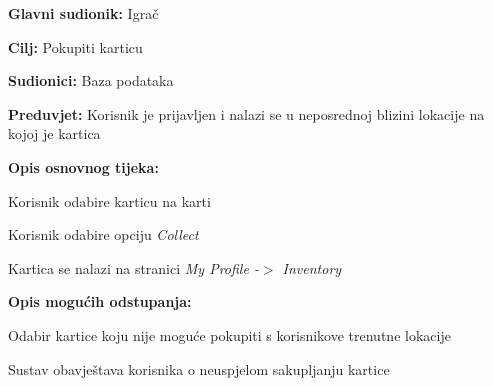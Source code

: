 					\noindent {}
					\begin{packed_item}
	
						\item \textbf{Glavni sudionik: }Igrač
						\item  \textbf{Cilj:} Pokupiti karticu
						\item  \textbf{Sudionici:} Baza podataka
						\item  \textbf{Preduvjet:} Korisnik je prijavljen i nalazi se u neposrednoj blizini lokacije na kojoj je kartica
						\item  \textbf{Opis osnovnog tijeka:}
						
						\item[] \begin{packed_enum}
	
							\item Korisnik odabire karticu na karti
							\item Korisnik odabire opciju \textit{Collect}
							\item Kartica se nalazi na stranici \textit{My Profile -$>$ Inventory} 

						\end{packed_enum}
						
						\item  \textbf{Opis mogućih odstupanja:}
						
						\item[] \begin{packed_item}
	
							\item[2.a] Odabir kartice koju nije moguće pokupiti s korisnikove trenutne lokacije
							\item[] \begin{packed_enum}
								
								\item Sustav obavještava korisnika o neuspjelom sakupljanju kartice
								
							\end{packed_enum}
							
						\end{packed_item}
					\end{packed_item}
					
